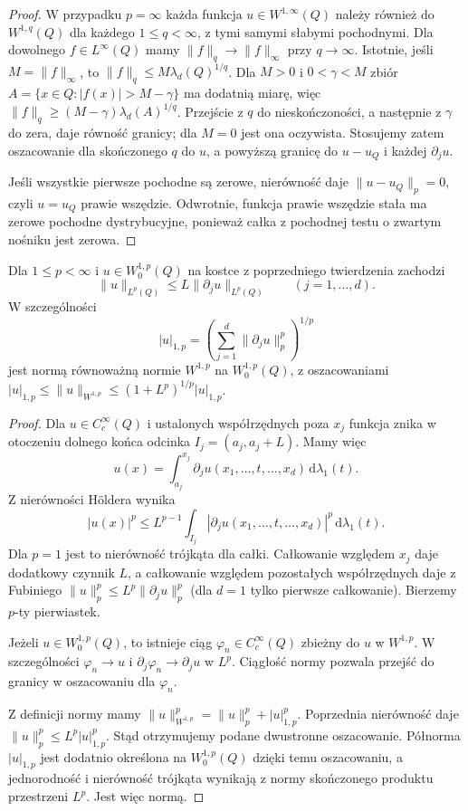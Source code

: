 \begin{proof}
W przypadku $p=\infty$ każda funkcja
$u\in W^{1,\infty}(Q)$ należy również do $W^{1,q}(Q)$
dla każdego $1\le q<\infty$, z tymi samymi słabymi pochodnymi.
Dla dowolnego $f\in L^\infty(Q)$ mamy
$\|f\|_q\to\|f\|_\infty$ przy $q\to\infty$.
Istotnie, jeśli $M=\|f\|_\infty$, to
$\|f\|_q\le M\lambda_d(Q)^{1/q}$.
Dla $M>0$ i $0<\gamma<M$ zbiór
$A=\{x\in Q:|f(x)|>M-\gamma\}$ ma dodatnią miarę,
więc $\|f\|_q\ge(M-\gamma)\lambda_d(A)^{1/q}$.
Przejście z $q$ do nieskończoności, a następnie
z $\gamma$ do zera, daje równość granicy; dla $M=0$
jest ona oczywista. Stosujemy zatem oszacowanie dla
skończonego $q$ do $u$, a powyższą granicę do
$u-u_Q$ i każdej $\partial_j u$.

Jeśli wszystkie pierwsze pochodne są zerowe,
nierówność daje $\|u-u_Q\|_p=0$, czyli $u=u_Q$
prawie wszędzie. Odwrotnie, funkcja prawie wszędzie
stała ma zerowe pochodne dystrybucyjne, ponieważ
całka z pochodnej testu o zwartym nośniku jest zerowa.
\end{proof}

\begin{wniosek}
\label{cor:pde9-Poincare-zero}
Dla $1\le p<\infty$ i $u\in W^{1,p}_0(Q)$
na kostce z poprzedniego twierdzenia zachodzi
\[
 \|u\|_{L^p(Q)}\le L\|\partial_j u\|_{L^p(Q)}
 \qquad (j=1,\ldots,d).
\]
W szczególności
\[
 |u|_{1,p}=\left(\sum_{j=1}^d\|\partial_j u\|_p^p\right)^{1/p}
\]
jest normą równoważną normie $W^{1,p}$ na $W^{1,p}_0(Q)$,
z oszacowaniami
$|u|_{1,p}\le\|u\|_{W^{1,p}}\le(1+L^p)^{1/p}|u|_{1,p}$.
\end{wniosek}
\begin{proof}
Dla $u\in C_c^\infty(Q)$ i ustalonych współrzędnych
poza $x_j$ funkcja znika w otoczeniu dolnego końca
odcinka $I_j=(a_j,a_j+L)$. Mamy więc
\[
 u(x)=\int_{a_j}^{x_j}\partial_j u(x_1,\ldots,t,\ldots,x_d)
 \,\mathrm d\lambda_1(t).
\]
Z nierówności Höldera wynika
\[
 |u(x)|^p\le L^{p-1}\int_{I_j}
 |\partial_j u(x_1,\ldots,t,\ldots,x_d)|^p
 \,\mathrm d\lambda_1(t).
\]
Dla $p=1$ jest to nierówność trójkąta dla całki.
Całkowanie względem $x_j$ daje dodatkowy czynnik $L$,
a całkowanie względem pozostałych współrzędnych daje
z Fubiniego $\|u\|_p^p\le L^p\|\partial_j u\|_p^p$
(dla $d=1$ tylko pierwsze całkowanie).
Bierzemy $p$-ty pierwiastek.

Jeżeli $u\in W^{1,p}_0(Q)$, to istnieje ciąg
$\varphi_n\in C_c^\infty(Q)$ zbieżny do $u$ w $W^{1,p}$.
W szczególności $\varphi_n\to u$ i
$\partial_j\varphi_n\to\partial_j u$ w $L^p$.
Ciągłość normy pozwala przejść do granicy
w oszacowaniu dla $\varphi_n$.

Z definicji normy mamy
$\|u\|_{W^{1,p}}^p=\|u\|_p^p+|u|_{1,p}^p$.
Poprzednia nierówność daje $\|u\|_p^p\le L^p|u|_{1,p}^p$.
Stąd otrzymujemy podane dwustronne oszacowanie.
Półnorma $|u|_{1,p}$ jest dodatnio określona na
$W^{1,p}_0(Q)$ dzięki temu oszacowaniu, a jednorodność
i nierówność trójkąta wynikają z normy skończonego
produktu przestrzeni $L^p$. Jest więc normą.
\end{proof}

